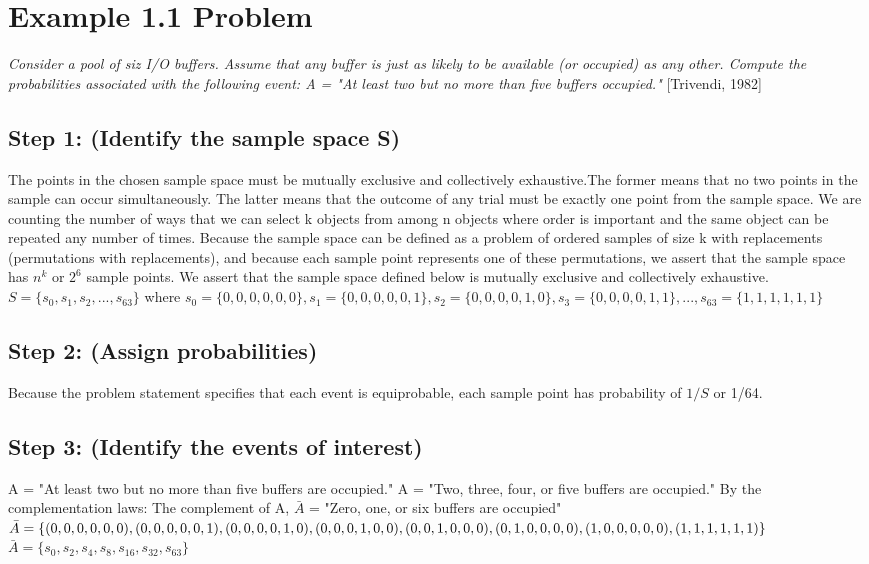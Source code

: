 \documentclass[a4paper,10pt]{article}
\title{}
\author{Mark Johnson \\
Loyola University Chicago}
\date {mjohnson4@luc.edu}
\begin{document}
\maketitle
\section{Example 1.1 Problem}
\emph{Consider a pool of siz I/O buffers. Assume that any buffer is just as likely to be available (or occupied) as 
any other. Compute the probabilities associated with the following event: \newline
A = "At least two but no more than five buffers occupied."} [Trivendi, 1982]
\subsection{Step 1: (Identify the sample space S)}
The points in the chosen sample space must be mutually exclusive and collectively exhaustive.The former means that no 
two points in the sample can occur simultaneously. The latter means that the outcome of any trial must be exactly one 
point from the sample space. We are counting the number of ways that we can select k objects from among n objects 
where order is important and the same object can be repeated any number of times. Because the sample space can be 
defined as a problem of ordered samples of size k with replacements (permutations with replacements), and because 
each sample point represents one of these permutations, we assert that the sample space has $ n^{k} $ or $ 2^{6} $ 
sample points. We assert that the sample space defined below is mutually exclusive and collectively exhaustive. 
\newline
$ S = \{s_{0}, s_{1}, s_{2},..., s_{63}\} $ where \newline
$ s_{0} = \{0,0,0,0,0,0\}, s_{1} = \{0,0,0,0,0,1\}, s_{2} = \{0,0,0,0,1,0\}, s_{3} = \{0,0,0,0,1,1\},..., s_{63} = 
\{1,1,1,1,1,1\} $
\subsection{Step 2: (Assign probabilities)}
Because the problem statement specifies that each event is equiprobable, each sample point has probability of $ 1/S $ 
or 1/64.
\subsection{Step 3: (Identify the events of interest)}
A = "At least two but no more than five buffers are occupied."
A = "Two, three, four, or five buffers are occupied."
By the complementation laws: \newline
The complement of A, $ \bar{A} $ = "Zero, one, or six buffers are 
occupied"
$ \bar{A} = \{(0,0,0,0,0,0), (0,0,0,0,0,1), (0,0,0,0,1,0), \newline
 (0,0,0,1,0,0), (0,0,1,0,0,0), (0,1,0,0,0,0), (1,0,0,0,0,0), (1,1,1,1,1,1)\} $ \newline
$ \bar{A} = \{s_{0}, s_{2}, s_{4}, s_{8}, s_{16}, s_{32}, s_{63}\} $
\end{document}
